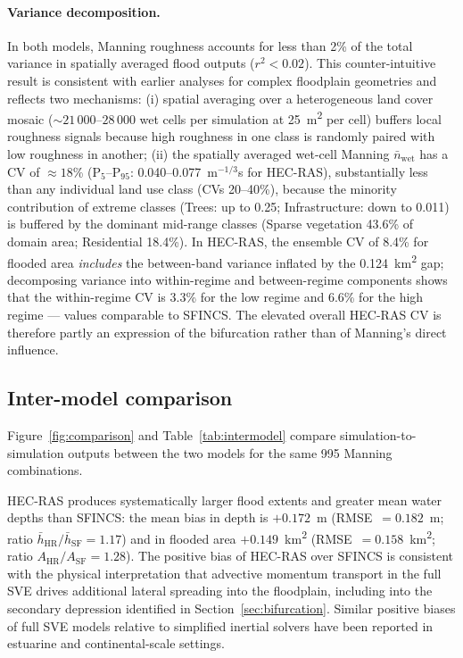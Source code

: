 \documentclass[review,12pt]{elsarticle}
\newcommand{\sfincs}{\textsc{SFINCS}}
\newcommand{\hecras}{\textsc{HEC-RAS}}
\begin{document}
\paragraph{Variance decomposition.}
In both models, Manning roughness accounts for less than 2\% of the total
variance in spatially averaged flood outputs ($r^2 < 0.02$).
This counter-intuitive result is consistent with earlier analyses for complex
floodplain geometries \citep{aronica2002, hall2005, fewtrell2011} and
reflects two mechanisms: (i) spatial averaging over a heterogeneous land
cover mosaic ($\sim 21\,000$--$28\,000$ wet cells per simulation at
25~m\textsuperscript{2} per cell) buffers local roughness signals
because high roughness in one class is randomly paired with low roughness
in another; (ii) the spatially averaged wet-cell Manning $\bar{n}_{\mathrm{wet}}$
has a CV of $\approx 18$\%
(P$_5$--P$_{95}$: 0.040--0.077~m$^{-1/3}$s for \hecras{}),
substantially less than any individual land use class (CVs 20--40\%),
because the minority contribution of extreme classes
(Trees: up to 0.25; Infrastructure: down to 0.011) is buffered by the
dominant mid-range classes (Sparse vegetation 43.6\% of domain area;
Residential 18.4\%).
In \hecras{}, the ensemble CV of 8.4\% for flooded area \emph{includes}
the between-band variance inflated by the 0.124~km\textsuperscript{2} gap;
decomposing variance into within-regime and between-regime components shows
that the within-regime CV is 3.3\% for the low regime and 6.6\% for the high
regime --- values comparable to \sfincs{}. The elevated overall \hecras{} CV
is therefore partly an expression of the bifurcation rather than of
Manning's direct influence.

\subsection{Inter-model comparison}
\label{sec:inter}

Figure~\ref{fig:comparison} and Table~\ref{tab:intermodel} compare
simulation-to-simulation outputs between the two models for the same 995
Manning combinations.

\hecras{} produces systematically larger flood extents and greater mean
water depths than \sfincs{}: the mean bias in depth is $+0.172$~m
(RMSE~$= 0.182$~m; ratio $\bar{h}_{\mathrm{HR}}/\bar{h}_{\mathrm{SF}} = 1.17$)
and in flooded area $+0.149$~km\textsuperscript{2}
(RMSE~$= 0.158$~km\textsuperscript{2};
ratio $A_{\mathrm{HR}}/A_{\mathrm{SF}} = 1.28$).
The positive bias of \hecras{} over \sfincs{} is consistent with the physical
interpretation that advective momentum transport in the full SVE drives
additional lateral spreading into the floodplain, including into the secondary
depression identified in Section~\ref{sec:bifurcation}.
Similar positive biases of full SVE models relative to simplified inertial
solvers have been reported in estuarine \citep{kumbier2019} and
continental-scale \citep{vandaele2024} settings.
\end{document}
